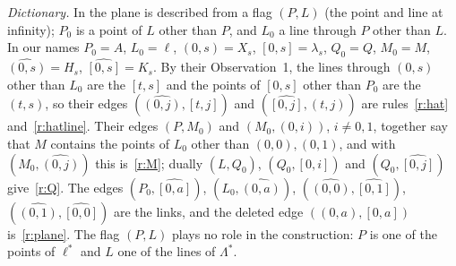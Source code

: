 \documentclass[11pt]{amsart}
\theoremstyle{definition}
\theoremstyle{remark}
\newcommand{\lam}{\lambda}
\begin{document}
\emph{Dictionary.} In \cite{AL20} the plane is described from a flag $(P,L)$ (the point and line at infinity); $P_0$ is a point of $L$ other than $P$, and $L_0$ a line through $P$ other than $L$. In our names $P_0=A$, $L_0=\ell$, $(0,s)=X_s$, $[0,s]=\lam_s$, $Q_0=Q$, $M_0=M$, $\widehat{(0,s)}=H_s$, $\widehat{[0,s]}=K_s$. By their Observation~1, the lines through $(0,s)$ other than $L_0$ are the $[t,s]$ and the points of $[0,s]$ other than $P_0$ are the $(t,s)$, so their edges $(\widehat{(0,j)},[t,j])$ and $(\widehat{[0,j]},(t,j))$ are rules~\ref{r:hat} and~\ref{r:hatline}. Their edges $(P,M_0)$ and $(M_0,(0,i))$, $i\ne 0,1$, together say that $M$ contains the points of $L_0$ other than $(0,0),(0,1)$, and with $(M_0,\widehat{(0,j)})$ this is~\ref{r:M}; dually $(L,Q_0)$, $(Q_0,[0,i])$ and $(Q_0,\widehat{[0,j]})$ give~\ref{r:Q}. The edges $(P_0,\widehat{[0,a]})$, $(L_0,\widehat{(0,a)})$, $(\widehat{(0,0)},\widehat{[0,1]})$, $(\widehat{(0,1)},\widehat{[0,0]})$ are the links, and the deleted edge $((0,a),[0,a])$ is~\ref{r:plane}. The flag $(P,L)$ plays no role in the construction: $P$ is one of the points of $\ell^*$ and $L$ one of the lines of $\Lambda^*$.
\end{document}

